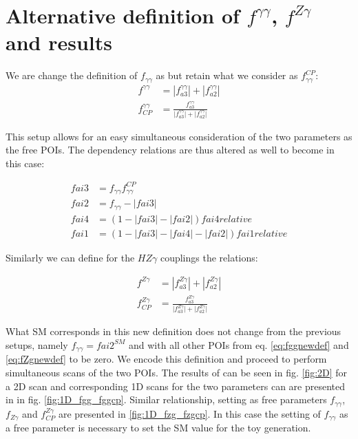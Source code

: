 \documentclass[10pt,a4paper]{article}
\begin{document}
\section{Alternative definition of $f^{\gamma\gamma}$, $f^{Z\gamma}$   and results }


We are change the definition of $f_{\gamma\gamma}$ as but retain what we consider as $f_{\gamma\gamma}^{CP}$: 
\begin{equation} \label{eq:fggnewdef}
\begin{aligned}
f^{\gamma\gamma} &= |f_{a3}^{\gamma\gamma}| + |f_{a2}^{\gamma\gamma}| \\
f^{\gamma\gamma}_{CP} &= \frac{f_{a3}^{\gamma\gamma}}{\lvert f_{a3}^{\gamma\gamma} \rvert + \lvert f_{a2}^{\gamma\gamma} \rvert}
\end{aligned}
\end{equation}

This setup allows for an easy simultaneous consideration of the two parameters as the free POIs. The dependency relations are thus altered as well to become in this case: 


\begin{equation}\label{eq:newdepfcp}
\begin{align}
fai3 &= f_{\gamma\gamma}f_{\gamma\gamma}^{CP}\\
fai2 &= f_{\gamma\gamma} - |fai3|  \\
fai4 &= (1-|fai3| -|fai2| )fai4relative\\
fai1 &= (1-|fai3| -|fai4| - |fai2| )fai1relative
\end{align}
\end{equation}

Similarly we can define for the $HZ\gamma$ couplings the relations: 


\begin{equation} \label{eq:fZgnewdef}
\begin{aligned}
f^{Z\gamma} &= |f_{a3}^{Z\gamma}| + |f_{a2}^{Z\gamma}| \\
f^{Z\gamma}_{CP} &= \frac{f_{a3}^{Z\gamma}}{\lvert f_{a3}^{Z\gamma} \rvert + \lvert f_{a2}^{Z\gamma} \rvert}
\end{aligned}
\end{equation}



What SM corresponds in this new definition does not change from the previous setups, namely 
$f_{\gamma\gamma} = fai2^{SM}$ and with all other POIs from eq. \ref{eq:fggnewdef} and \ref{eq:fZgnewdef} to be zero. We encode this definition and proceed to perform simultaneous scans of the two POIs. The results of can be seen in fig. \ref{fig:2D} for a 2D scan and corresponding 1D scans for the two parameters can are presented in in fig. \ref{fig:1D_fgg_fggcp}. Similar relationship, setting as free parameters $f_{\gamma\gamma}$, $f_{Z\gamma}$ and $f^{Z\gamma}_{CP}$ are presented in \ref{fig:1D_fzg_fzgcp}. In this case the setting of $f_{\gamma\gamma}$ as a free parameter is necessary to set the SM value for the toy generation. 
\end{document}
